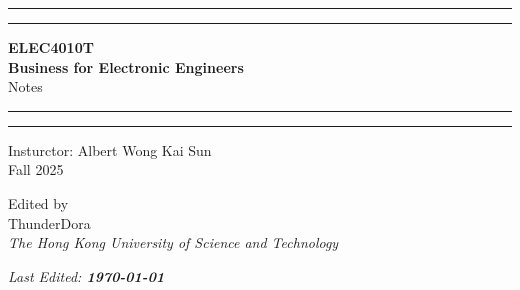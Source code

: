 \documentclass[twoside]{article}
\numberwithin{equation}{section}
\begin{document}
	\begin{titlepage}
		\centering
		\scshape
		\vspace*{\baselineskip}
		
		\rule{\textwidth}{1.6pt}\vspace{-\baselineskip}\vspace{2pt} %
		\rule{\textwidth}{0.4pt} %
		
		\vspace{0.5\baselineskip}
		
		{\LARGE \textbf{ELEC4010T \\ Business for Electronic Engineers} \\
			
			\vspace{0.75\baselineskip}
			\Large Notes}
		
		\vspace{0.5\baselineskip}
		
		\rule{\textwidth}{0.4pt}\vspace{-\baselineskip}\vspace{3.2pt} %
		\rule{\textwidth}{1.6pt} %
		
		\vspace{1.5\baselineskip}
		
		{\large Insturctor: Albert Wong Kai Sun \\
			\vspace{0.5\baselineskip} Fall 2025}
		
		\vspace{\baselineskip}
		
		{\Large Edited by \\
			\vspace{0.5\baselineskip}
			\Large ThunderDora \\

			\vspace{10pt}
			\large \textit{The Hong Kong University of Science and Technology}}
		
		\vspace{10\baselineskip}
		
		\textit{Last Edited: \textbf{\today}}
		
	\end{titlepage}
	
	\newpage
	
	\pagestyle{fancy}
	\fancyhf{}
	\renewcommand{\headrulewidth}{0pt}
	
\end{document}
